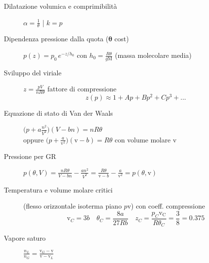\documentclass[10pt, oneside]{article}
\begin{document}
\begin{description}
\item[Dilatazione volumica e comprimibilità] $\displaystyle \alpha = \frac{1}{\theta}$ | $k = p$ 
\item[Dipendenza pressione dalla quota ($\mathbf{\theta}$ cost)] $\displaystyle p(z) = p_0 \, e^{- z/h_0}$ con $\displaystyle h_0 = \frac{R \theta}{g \mathrm{M}}$ (massa molecolare media)
\item[Sviluppo del viriale] $\displaystyle z = \frac{pV}{nR\theta}$ fattore di compressione
\[z(p) \approx 1 + A p + B p^2 + C p^3 + ...\]
\item[Equazione di stato di Van der Waals] $\boxed{\displaystyle \big(p + a \frac{n^2}{V^2}\big) (V - bn) = nR\theta}$ 
\\oppure $\displaystyle \big(p + \frac{a}{\mathrm{v}^2}\big) (\mathrm{v} - b) = R \theta$ con volume molare $\mathrm{v}$
\item[Pressione per GR] $\displaystyle p(\theta, V) = \frac{nR\theta}{V - bn} - \frac{an^2}{V^2} = \frac{R\theta}{\mathrm{v} - b} - \frac{a}{\mathrm{v}^2} = p(\theta, \mathrm{v})$
\item[Temperatura e volume molare critici] (flesso orizzontale isoterma piano $p \mathrm{v}$) con coeff. compressione
\[\mathrm{v}_C = 3 b \quad \theta_C = \frac{8 a}{27 R b} \quad z_C = \frac{p_C \mathrm{v_C}}{R \theta_C} = \frac{3}{8} = 0.375\]
\item[Vapore saturo] $\displaystyle \frac{n_L}{n_G} = \frac{\mathrm{v}_G - \mathrm{v}}{\mathrm{v} - \mathrm{v}_L}$
\end{description}
\end{document}
